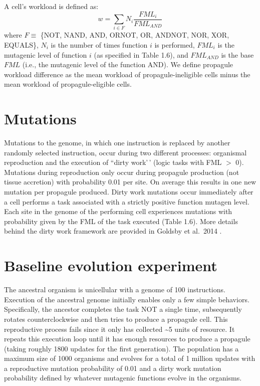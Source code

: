 \documentclass[
]{book}
\begin{document}
A cell's workload is defined as:
\[ w = \sum_{i \in F} N_i \frac{FML_i}{FML_{AND}} \]
where \(F \equiv\) \{NOT, NAND, AND, ORNOT, OR, ANDNOT, NOR, XOR, EQUALS\}, \(N_i\) is the number of times function \(i\) is performed, \(FML_i\) is the mutagenic level of function \(i\) (as specified in Table 1.6), and \(FML_{AND}\) is the base \(FML\) (i.e., the mutagenic level of the function AND).
We define propagule workload difference as the mean workload of propagule-ineligible cells minus the mean workload of propagule-eligible cells.

\hypertarget{mutations}{%
\section{Mutations}\label{mutations}}

Mutations to the genome, in which one instruction is replaced by another randomly selected instruction, occur during two different processes: organismal reproduction and the execution of ``dirty work'\,' (logic tasks with FML \(>\) 0).
Mutations during reproduction only occur during propagule production (not tissue accretion) with probability 0.01 per site. On average this results in one new mutation per propagule produced. Dirty work mutations occur immediately after a cell performs a task associated with a strictly positive function mutagen level. Each site in the genome of the performing cell experiences mutations with probability given by the FML of the task executed (Table 1.6). More details behind the dirty work framework are provided in Goldsby et al.~2014 \citep{goldsby2014evolutionary}.

\hypertarget{baseline-evolution-experiment}{%
\section{Baseline evolution experiment}\label{baseline-evolution-experiment}}

The ancestral organism is unicellular with a genome of 100 instructions. Execution of the ancestral genome initially enables only a few simple behaviors. Specifically, the ancestor completes the task NOT a single time, subsequently rotates counterclockwise and then tries to produce a propagule cell. This reproductive process fails since it only has collected \textasciitilde5 units of resource. It repeats this execution loop until it has enough resources to produce a propagule (taking roughly 1800 updates for the first generation). The population has a maximum size of 1000 organisms and evolves for a total of 1 million updates with a reproductive mutation probability of 0.01 and a dirty work mutation probability defined by whatever mutagenic functions evolve in the organisms.
\end{document}
